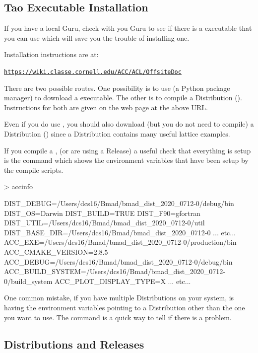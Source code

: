 \documentclass{hitec}     %
\newenvironment{display}
  {\vspace*{-1.5ex} \begin{alltt}}
  {\end{alltt} \vspace*{-1.0ex}}
\begin{document}
\subsection{Tao Executable Installation}
\label{s:install}

If you have a local \bmad Guru, check with you Guru to see if there is a \tao executable that you
can use which will save you the trouble of installing one.

Installation instructions are at:
\begin{display}
  \url{https://wiki.classe.cornell.edu/ACC/ACL/OffsiteDoc}
\end{display}
There are two possible routes. One possibility is to use  (a Python
package manager) to download a \tao executable. The other is to compile a \bmad Distribution
(). Instructions for both are given on the web page at the above URL.

Even if you do use , you should also download (but you do not need to compile) a
Distribution () since a Distribution contains many useful lattice examples.

If you compile a , (or are using a Release) a useful check that everything is setup
is the  command which shows the environment variables that have been setup by the
compile scripts.
\begin{code}
> accinfo

DIST_DEBUG=/Users/dcs16/Bmad/bmad_dist_2020_0712-0/debug/bin
DIST_OS=Darwin
DIST_BUILD=TRUE
DIST_F90=gfortran
DIST_UTIL=/Users/dcs16/Bmad/bmad_dist_2020_0712-0/util
DIST_BASE_DIR=/Users/dcs16/Bmad/bmad_dist_2020_0712-0
... etc...
ACC_EXE=/Users/dcs16/Bmad/bmad_dist_2020_0712-0/production/bin
ACC_CMAKE_VERSION=2.8.5
ACC_DEBUG=/Users/dcs16/Bmad/bmad_dist_2020_0712-0/debug/bin
ACC_BUILD_SYSTEM=/Users/dcs16/Bmad/bmad_dist_2020_0712-0/build_system
ACC_PLOT_DISPLAY_TYPE=X
... etc...
\end{code}
One common mistake, if you have multiple Distributions on your system, is having the environment
variables pointing to a Distribution other than the one you want to use. The  command
is a quick way to tell if there is a problem.

\subsection{Distributions and Releases}
\label{s:dist}
\end{document}
